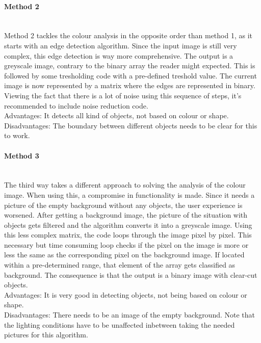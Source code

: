 \documentclass[11pt]{article}
\begin{document}
\paragraph{Method 2}\mbox{}\\
Method 2 tackles the colour analysis in the opposite order than method 1, as it starts with an edge detection algorithm. Since the input image is still very complex, this edge detection is way more comprehensive. The output is a greyscale image, contrary to the binary array the reader might expected. This is followed by some tresholding code with a pre-defined treshold value. The current image is now represented by a matrix where the edges are represented in binary. Viewing the fact that there is a lot of noise using this sequence of steps, it's recommended to include noise reduction code. 
\\Advantages: It detects all kind of objects, not based on colour or shape.
\\Disadvantages: The boundary between different objects needs to be clear for this to work.

\paragraph{Method 3}\mbox{}\\
The third way takes a different approach to solving the analysis of the colour image. When using this, a compromise in functionality is made. Since it needs a picture of the empty background without any objects, the user experience is worsened. After getting a background image, the picture of the situation with objects gets filtered and the algorithm converts it into a greyscale image. Using this less complex matrix, the code loops through the image pixel by pixel. This necessary but time consuming loop checks if the pixel on the image is more or less the same as the corresponding pixel on the background image. If located within a pre-determined range, that element of the array gets classified as background. The consequence is that the output is a binary image with clear-cut objects.
\\Advantages: It is very good in detecting objects, not being based on colour or shape.
\\Disadvantages: There needs to be an image of the empty background. Note that the lighting conditions have to be unaffected inbetween taking the needed pictures for this algorithm.
\end{document}
